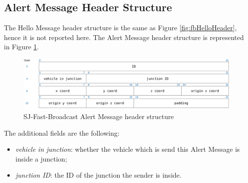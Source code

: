 		\subsection{Alert Message Header Structure}
			The Hello Message header structure is the same as Figure \ref{fig:fbHelloHeader}, hence it is not reported here. The Alert Message header structure is represented in Figure \ref{fig:sj-fbAlertHeader}.
			
			\begin{figure}[H]
				\centering
				\includegraphics[width=\textwidth]{immagini/sj-fbAlertHeader}
				\caption{SJ-Fast-Broadcast Alert Message header structure}
				\label{fig:sj-fbAlertHeader}
			\end{figure}
			
			The additional fields are the following:
			\begin{itemize}
				\item  \textit{vehicle in junction}: whether the vehicle which is send this Alert Message is inside a junction;
				\item \textit{junction ID}: the ID of the junction the sender is inside.
			\end{itemize}
